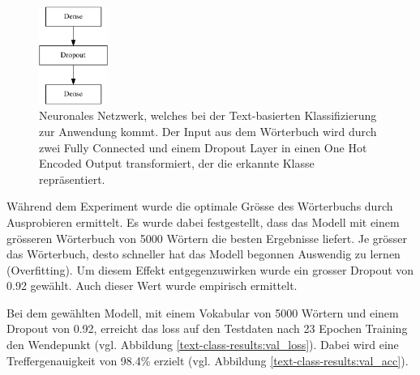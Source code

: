 \begin{figure}[h!]
    \captionsetup{width=.8\linewidth}
    \caption{Neuronales Netzwerk, welches bei der Text-basierten Klassifizierung zur Anwendung kommt. Der Input aus dem Wörterbuch wird durch zwei Fully Connected und einem Dropout Layer in einen One Hot Encoded Output transformiert, der die erkannte Klasse repräsentiert.}
    \label{text-classification-model}
    \centering
    \includegraphics[width=0.2\textwidth]{graphics/text-classification/model.pdf}

\end{figure} 

Während dem Experiment wurde die optimale Grösse des Wörterbuchs durch Ausprobieren ermittelt. Es wurde dabei festgestellt, dass das Modell mit einem grösseren Wörterbuch von 5000 Wörtern die besten Ergebnisse liefert. Je grösser das Wörterbuch, desto schneller hat das Modell begonnen Auswendig zu lernen (Overfitting). Um diesem Effekt entgegenzuwirken wurde ein grosser Dropout von 0.92 gewählt. Auch dieser Wert wurde empirisch ermittelt.

Bei dem gewählten Modell, mit einem Vokabular von 5000 Wörtern und einem Dropout von 0.92, erreicht das loss auf den Testdaten nach 23 Epochen Training den Wendepunkt (vgl. Abbildung \ref{text-class-results:val_loss}). Dabei wird eine Treffergenauigkeit von 98.4\% erzielt (vgl. Abbildung \ref{text-class-results:val_acc}). 

